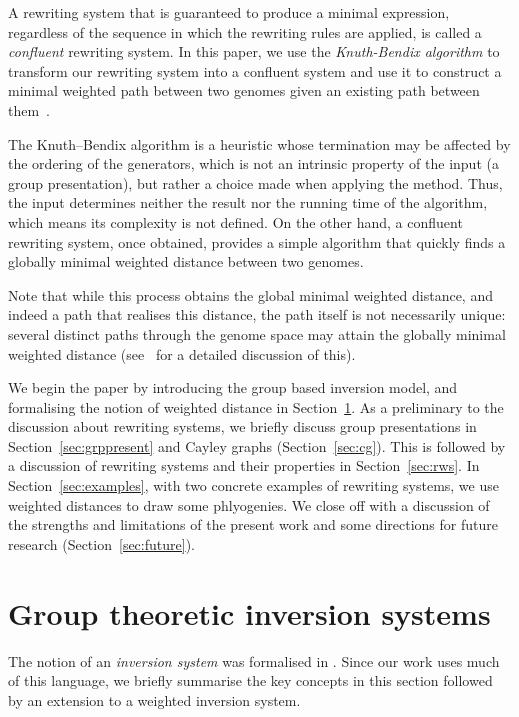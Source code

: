 \documentclass[utf8]{Frontiers_LaTex_Templates/frontiersFPHY} %
\numberwithin{equation}{section}
\begin{document}
A rewriting system that is guaranteed to produce a minimal expression, regardless of the sequence in which the rewriting rules are applied, is called a \emph{confluent} rewriting system.  In this paper, we use the \emph{Knuth-Bendix algorithm}  to transform our rewriting system into a confluent system and use it to construct a minimal weighted path between two genomes given an existing path between them~\citep{knuth1983simple}.

The Knuth--Bendix algorithm is a heuristic whose termination may be affected by the ordering of the generators, which is not an intrinsic property of the input (a group presentation), but rather a choice made when applying the method.  Thus, the input determines neither the result nor the running time of the algorithm, which means its complexity is not defined.  On the other hand, a confluent rewriting system, once obtained, provides a simple algorithm that quickly finds a globally minimal weighted distance between two genomes.  

Note that while this process obtains the global minimal weighted distance, and indeed a path that realises this distance, the path itself is not necessarily unique: several distinct paths through the genome space may attain the globally minimal weighted distance (see~\cite{clark2019bacterial} for a detailed discussion of this).  

We begin the paper by introducing the group based inversion model, and formalising the notion of weighted distance in Section~\ref{subs:invsys}. As a preliminary to the discussion about rewriting systems, we briefly discuss group presentations in Section~\ref{sec:grppresent} and Cayley graphs (Section~\ref{sec:cg}). This is followed by a discussion of rewriting systems and their properties in Section~\ref{sec:rws}. In Section~\ref{sec:examples}, with two concrete examples of rewriting systems, we use weighted distances to draw some phlyogenies. We close off with a discussion of the strengths and limitations of the present work and some directions for future research (Section~\ref{sec:future}).


\section[Inversion systems]{Group theoretic inversion systems}\label{subs:invsys}

The notion of an \emph{inversion system} was formalised in \citet{egrinagy2013group}. Since our work uses much of this language, we briefly summarise the key concepts in this section followed by an extension to a weighted inversion system.  
\end{document}
